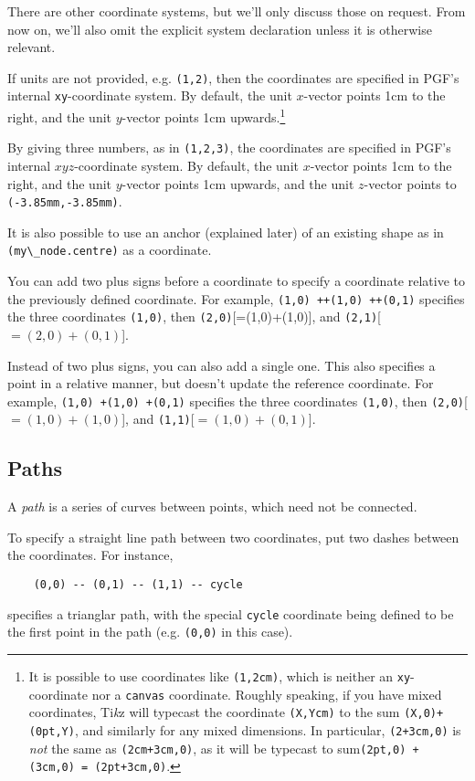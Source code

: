 \documentclass{article}
\theoremstyle{definition}
\theoremstyle{definition}
\theoremstyle{remark}
\newcommand{\Tikz}{Ti\textit{k}z{}}
\begin{document}
There are other coordinate systems, but we'll only discuss those on request. From now on, we'll also omit the explicit system declaration unless it is otherwise relevant.

If units are not provided, e.g. \verb|(1,2)|, then the coordinates are specified in PGF's internal \verb|xy|-coordinate system. By default, the unit $x$-vector points 1cm to the right, and the unit $y$-vector points 1cm upwards.\footnote{It is possible to use coordinates like \verb|(1,2cm)|, which is neither an \verb|xy|-coordinate nor a \verb|canvas| coordinate. Roughly speaking, if you have mixed coordinates, \Tikz{} will typecast the coordinate \verb|(X,Ycm)| to the sum \verb|(X,0)+(0pt,Y)|, and similarly for any mixed dimensions. In particular, \verb|(2+3cm,0)| is \textit{not} the same as \verb|(2cm+3cm,0)|, as it will be typecast to sum\verb|(2pt,0) + (3cm,0) = (2pt+3cm,0)|.}

By giving three numbers, as in \verb|(1,2,3)|, the coordinates are specified in PGF's internal $xyz$-coordinate system. By default, the unit $x$-vector points 1cm to the right, and the unit $y$-vector points 1cm upwards, and the unit $z$-vector points to \verb|(-3.85mm,-3.85mm)|.

It is also possible to use an anchor (explained later) of an existing shape as in \verb|(my\_node.centre)| as a coordinate.

You can add two plus signs before a coordinate to specify a coordinate relative to the previously defined coordinate. For example, \verb|(1,0) ++(1,0) ++(0,1)| specifies the three coordinates \verb|(1,0)|, then \verb|(2,0)|[=(1,0)+(1,0)], and \verb|(2,1)|[$=(2,0)+(0,1)$].

Instead of two plus signs, you can also add a single one. This also specifies a point in a relative manner, but doesn't update the reference coordinate. For example, \verb|(1,0) +(1,0) +(0,1)| specifies the three coordinates \verb|(1,0)|, then \verb|(2,0)|[$=(1,0)+(1,0)$], and \verb|(1,1)|[$=(1,0)+(0,1)$].






\subsection*{Paths}

A \textit{path} is a series of curves between points, which need not be connected.

To specify a straight line path between two coordinates, put two dashes between the coordinates. For instance,
\begin{verbatim}
    (0,0) -- (0,1) -- (1,1) -- cycle
\end{verbatim}
specifies a trianglar path, with the special \verb|cycle| coordinate being defined to be the first point in the path (e.g. \verb|(0,0)| in this case).
\end{document}
